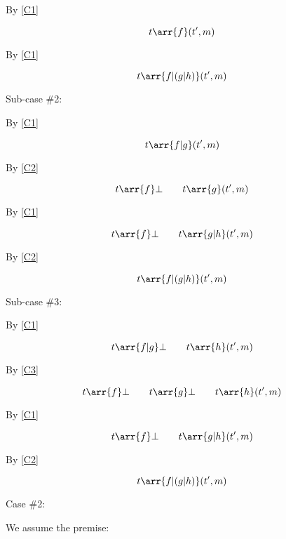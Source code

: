 By \eqref{C1}

\begin{equation}
t \arr{f} (t',m)
\end{equation}

By \eqref{C1}

\begin{equation}
t \arr{f|(g|h)} (t',m)
\end{equation}

Sub-case \#2:

By \eqref{C1}

\begin{equation}
t \arr{f|g} (t',m)
\end{equation}

By \eqref{C2}

\begin{equation}
t \arr{f} \bot \qquad t \arr{g} (t',m)
\end{equation}

By \eqref{C1}

\begin{equation}
t \arr{f} \bot \qquad t \arr{g|h} (t',m)
\end{equation}

By \eqref{C2}

\begin{equation}
t \arr{f|(g|h)} (t',m)
\end{equation}

Sub-case \#3:

By \eqref{C1}

\begin{equation}
t \arr{f|g} \bot \qquad t \arr{h} (t',m)
\end{equation}

By \eqref{C3}

\begin{equation}
t \arr{f} \bot \qquad t \arr{g} \bot \qquad t \arr{h} (t',m)
\end{equation}

By \eqref{C1}

\begin{equation}
t \arr{f} \bot \qquad t \arr{g|h} (t',m)
\end{equation}

By \eqref{C2}

\begin{equation}
t \arr{f|(g|h)} (t',m)
\end{equation}

Case \#2:

We assume the premise:


